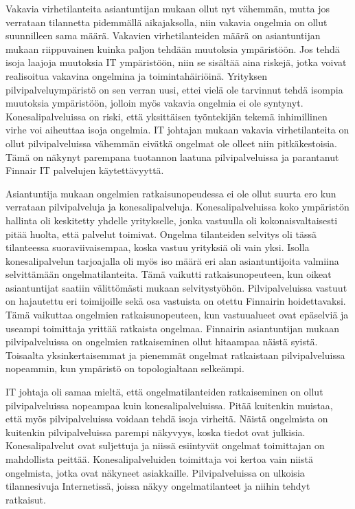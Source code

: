 Vakavia virhetilanteita asiantuntijan mukaan ollut nyt vähemmän, mutta jos verrataan tilannetta pidemmällä aikajaksolla, niin vakavia ongelmia on ollut suunnilleen sama määrä. Vakavien virhetilanteiden määrä on asiantuntijan mukaan riippuvainen kuinka paljon tehdään muutoksia ympäristöön. Jos tehdä isoja laajoja muutoksia IT ympäristöön, niin se sisältää aina riskejä, jotka voivat realisoitua vakavina ongelmina ja toimintahäiriöinä. Yrityksen pilvipalveluympäristö on sen verran uusi, ettei vielä ole tarvinnut tehdä isompia muutoksia ympäristöön, jolloin myös vakavia ongelmia ei ole syntynyt. Konesalipalveluissa on riski, että yksittäisen työntekijän tekemä inhimillinen virhe voi aiheuttaa isoja ongelmia. IT johtajan mukaan vakavia virhetilanteita on ollut pilvipalveluissa vähemmän eivätkä ongelmat ole olleet niin pitkäkestoisia. Tämä on näkynyt parempana tuotannon laatuna pilvipalveluissa ja parantanut Finnair IT palvelujen käytettävyyttä.

Asiantuntija mukaan ongelmien ratkaisunopeudessa ei ole ollut suurta ero kun verrataan pilvipalveluja ja konesalipalveluja. Konesalipalveluissa koko ympäristön hallinta oli keskitetty yhdelle yritykselle, jonka vastuulla oli kokonaisvaltaisesti pitää huolta, että palvelut toimivat. Ongelma tilanteiden selvitys oli tässä tilanteessa suoraviivaisempaa, koska vastuu yrityksiä oli vain yksi. Isolla konesalipalvelun tarjoajalla oli myös iso määrä eri alan asiantuntijoita valmiina selvittämään ongelmatilanteita. Tämä vaikutti ratkaisunopeuteen, kun oikeat asiantuntijat saatiin välittömästi mukaan selvitystyöhön. Pilvipalveluissa vastuut on hajautettu eri toimijoille sekä osa vastuista on otettu Finnairin hoidettavaksi. Tämä vaikuttaa ongelmien ratkaisunopeuteen, kun vastuualueet ovat epäselviä ja useampi toimittaja yrittää ratkaista ongelmaa. Finnairin asiantuntijan mukaan pilvipalveluissa on ongelmien ratkaiseminen ollut hitaampaa näistä syistä. Toisaalta yksinkertaisemmat ja pienemmät ongelmat ratkaistaan pilvipalveluissa nopeammin, kun ympäristö on topologialtaan selkeämpi.

IT johtaja oli samaa mieltä, että ongelmatilanteiden ratkaiseminen on ollut pilvipalveluissa nopeampaa kuin konesalipalveluissa. Pitää kuitenkin muistaa, että myös pilvipalveluissa voidaan tehdä isoja virheitä. Näistä ongelmista on kuitenkin pilvipalveluissa parempi näkyvyys, koska tiedot ovat julkisia. Konesalipalvelut ovat suljettuja ja niissä esiintyvät ongelmat toimittajan on mahdollista peittää. Konesalipalveluiden toimittaja voi kertoa vain niistä ongelmista, jotka ovat näkyneet asiakkaille. Pilvipalveluissa on ulkoisia tilannesivuja Internetissä, joissa näkyy ongelmatilanteet ja niihin tehdyt ratkaisut.


